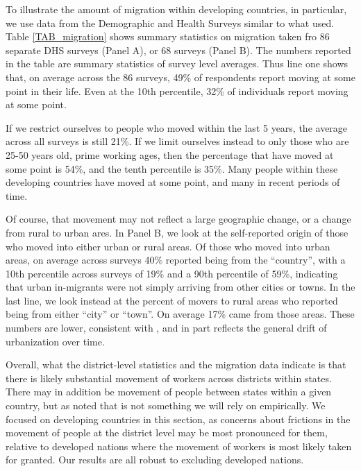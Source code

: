 \documentclass[11pt]{article}
\begin{document}
To illustrate the amount of migration within developing countries, in particular, we use data from the Demographic and Health Surveys \citep{DHS} similar to what \cite{young2013inequality} used. Table \ref{TAB_migration} shows summary statistics on migration taken fro 86 separate DHS surveys (Panel A), or 68 surveys (Panel B). The numbers reported in the table are summary statistics of survey level averages. Thus line one shows that, on average across the 86 surveys, 49\% of respondents report moving at some point in their life. Even at the 10th percentile, 32\% of individuals report moving at some point. 

If we restrict ourselves to people who moved within the last 5 years, the average across all surveys is still 21\%. If we limit ourselves instead to only those who are 25-50 years old, prime working ages, then the percentage that have moved at some point is 54\%, and the tenth percentile is 35\%. Many people within these developing countries have moved at some point, and many in recent periods of time. 

Of course, that movement may not reflect a large geographic change, or a change from rural to urban ares. In Panel B, we look at the self-reported origin of those who moved into either urban or rural areas. Of those who moved into urban areas, on average across surveys 40\% reported being from the ``country'', with a 10th percentile across surveys of 19\% and a 90th percentile of 59\%, indicating that urban in-migrants were not simply arriving from other cities or towns. In the last line, we look instead at the percent of movers to rural areas who reported being from either ``city'' or ``town''. On average 17\% came from those areas. These numbers are lower, consistent with \cite{young2013inequality}, and in part reflects the general drift of urbanization over time.

Overall, what the district-level statistics and the migration data indicate is that there is likely substantial movement of workers across districts within states. There may in addition be movement of people between states within a given country, but as noted that is not something we will rely on empirically. We focused on developing countries in this section, as concerns about frictions in the movement of people at the district level may be most pronounced for them, relative to developed nations where the movement of workers is most likely taken for granted. Our results are all robust to excluding developed nations.
\end{document}
